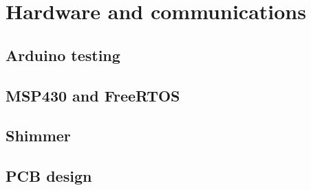 \chapter{Hardware and communications}
\label{ch:hardware}
	
	
	\section{Arduino testing}
	
	\section{MSP430 and FreeRTOS}
	
	\section{Shimmer}
	
	\section{PCB design}
